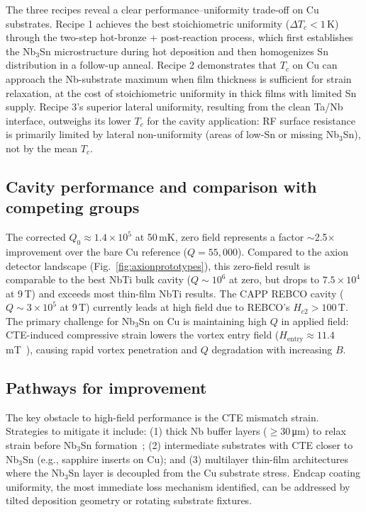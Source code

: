\documentclass{iopjournal}
\begin{document}
The three recipes reveal a clear performance--uniformity trade-off on Cu substrates. Recipe 1 achieves the best stoichiometric uniformity ($\Delta T_c < 1$\,K) through the two-step hot-bronze + post-reaction process, which first establishes the Nb$_3$Sn microstructure during hot deposition and then homogenizes Sn distribution in a follow-up anneal. Recipe 2 demonstrates that $T_c$ on Cu can approach the Nb-substrate maximum when film thickness is sufficient for strain relaxation, at the cost of stoichiometric uniformity in thick films with limited Sn supply. Recipe 3's superior lateral uniformity, resulting from the clean Ta/Nb interface, outweighs its lower $T_c$ for the cavity application: RF surface resistance is primarily limited by lateral non-uniformity (areas of low-Sn or missing Nb$_3$Sn), not by the mean $T_c$.

\subsection{Cavity performance and comparison with competing groups}

The corrected $Q_0 \approx 1.4 \times 10^5$ at 50\,mK, zero field represents a factor $\sim$2.5$\times$ improvement over the bare Cu reference ($Q = 55{,}000$). Compared to the axion detector landscape (Fig.~\ref{fig:axionprototypes}), this zero-field result is comparable to the best NbTi bulk cavity ($Q \sim 10^6$ at zero, but drops to $7.5 \times 10^4$ at 9\,T) and exceeds most thin-film NbTi results. The CAPP REBCO cavity ($Q \sim 3 \times 10^5$ at 9\,T) currently leads at high field due to REBCO's $H_{c2} > 100$\,T. The primary challenge for Nb$_3$Sn on Cu is maintaining high $Q$ in applied field: CTE-induced compressive strain lowers the vortex entry field ($H_\text{entry} \approx 11.4$\,mT~\cite{luImpactCuSn2025}), causing rapid vortex penetration and $Q$ degradation with increasing $B$.

\subsection{Pathways for improvement}

The key obstacle to high-field performance is the CTE mismatch strain. Strategies to mitigate it include: (1) thick Nb buffer layers ($\geq 30$\,\unit{\micro\meter}) to relax strain before Nb$_3$Sn formation~\cite{Ilyina-Brunner:2019iay}; (2) intermediate substrates with CTE closer to Nb$_3$Sn (e.g., sapphire inserts on Cu); and (3) multilayer thin-film architectures where the Nb$_3$Sn layer is decoupled from the Cu substrate stress. Endcap coating uniformity, the most immediate loss mechanism identified, can be addressed by tilted deposition geometry or rotating substrate fixtures.
\end{document}
